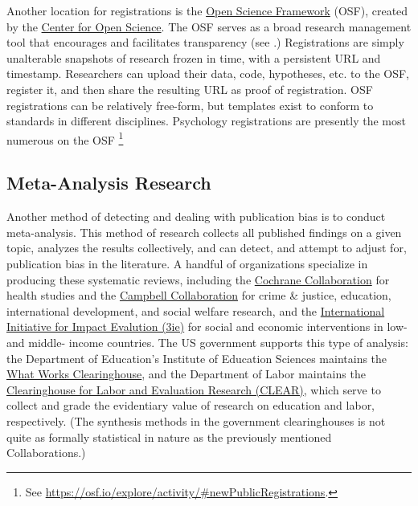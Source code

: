 \documentclass[12pt] {article}
\begin{document}
Another location for registrations is the \href{http://osf.io}{Open Science Framework} (OSF), created by the \href{http://centerforopenscience.org/}{Center for Open Science}. The OSF serves as a broad research management tool that encourages and facilitates transparency (see \cite{nosek_scientific_2012}.) Registrations are simply unalterable snapshots of research frozen in time, with a persistent URL and timestamp. Researchers can upload their data, code, hypotheses, etc. to the OSF, register it, and then share the resulting URL as proof of registration. OSF registrations can be relatively free-form, but templates exist to conform to standards in different disciplines. Psychology registrations are presently the most numerous on the OSF \footnote{See \url{https://osf.io/explore/activity/\#newPublicRegistrations}.}

\subsection{Meta-Analysis Research}
Another method of detecting and dealing with publication bias is to conduct meta-analysis. This method of research collects all published findings on a given topic, analyzes the results collectively, and can detect, and attempt to adjust for, publication bias in the literature. A handful of organizations specialize in producing these systematic reviews, including the \href{http://www.cochrane.org}{Cochrane Collaboration} for health studies and the \href{http://www.campbellcollaboration.org/}{Campbell Collaboration} for crime \& justice, education, international development, and social welfare research, and the \href{http://www.3ie.org}{International Initiative for Impact Evalution (3ie)} for social and economic interventions in low- and middle- income countries. The US government supports this type of analysis: the Department of Education's Institute of Education Sciences maintains the \href{http://ies.ed.gov/ncee/wwc/}{What Works Clearinghouse}, and the Department of Labor maintains the \href{http://clear.dol.gov/}{Clearinghouse for Labor and Evaluation Research (CLEAR)}, which serve to collect and grade the evidentiary value of research on education and labor, respectively. (The synthesis methods in the government clearinghouses is not quite as formally statistical in nature as the previously mentioned Collaborations.)
\end{document}
